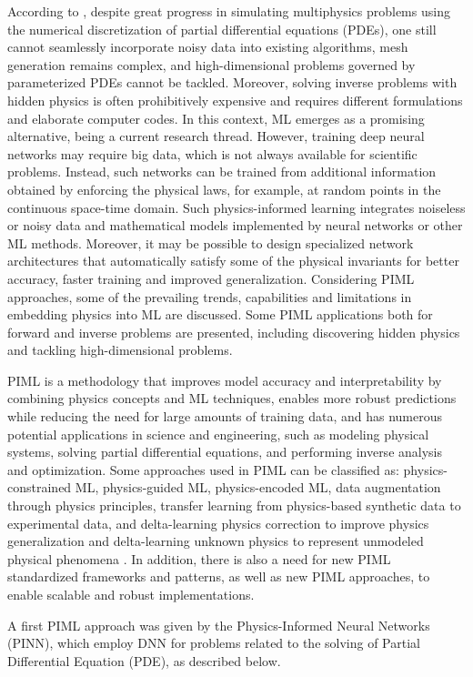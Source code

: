 According to , despite great progress in simulating multiphysics problems using the numerical discretization of partial differential equations (PDEs), one still cannot seamlessly incorporate noisy data into existing algorithms, mesh generation remains complex, and high-dimensional problems governed by parameterized PDEs cannot be tackled. Moreover, solving inverse problems with hidden physics is often prohibitively expensive and requires different formulations and elaborate computer codes. In this context, ML emerges as a promising alternative, being a current research thread. However, training deep neural networks may require big data, which is not always available for scientific problems. Instead, such networks can be trained from additional information obtained by enforcing the physical laws, for example, at random points in the continuous space-time domain. Such physics-informed learning integrates noiseless or noisy data and mathematical models implemented by neural networks or other ML methods. Moreover, it may be possible to design specialized network architectures that automatically satisfy some of the physical invariants for better accuracy, faster training and improved generalization. Considering PIML approaches, some of the prevailing trends, capabilities and limitations in embedding physics into ML are discussed. Some PIML applications both for forward and inverse problems are presented, including discovering hidden physics and tackling high-dimensional problems.

PIML is a methodology that improves model accuracy and interpretability by combining physics concepts and ML techniques, enables more robust predictions while reducing the need for large amounts of training data, and has numerous potential applications in science and engineering, such as modeling physical systems, solving partial differential equations, and performing inverse analysis and optimization. Some approaches used in PIML can be classified as: physics-constrained ML, physics-guided ML, physics-encoded ML, data augmentation through physics principles, transfer learning from physics-based synthetic data to experimental data, and delta-learning physics correction to improve physics generalization and delta-learning unknown physics to represent unmodeled physical phenomena \cite{Tronci2024}. In addition, there is also a need for new PIML standardized frameworks and patterns, as well as new PIML approaches, to enable scalable and robust implementations. 

A first PIML approach was given by the Physics-Informed Neural Networks (PINN), which employ DNN for problems related to the solving of Partial Differential Equation (PDE), as described below.


